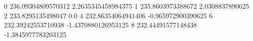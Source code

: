 0 236.09304809570312 2.2635345458984375
1 235.8603973388672 2.0308837890625
2 233.8295135498047 0.0
4 232.86354064941406 -0.965972900390625
6 232.39242553710938 -1.4370880126953125
8 232.44491577148438 -1.3845977783203125
